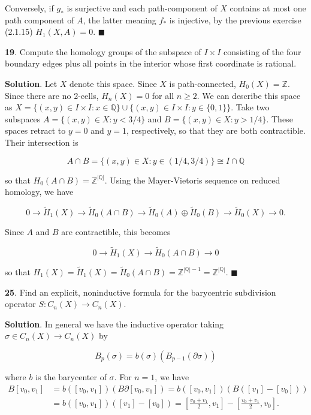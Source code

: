 \documentclass{article}
\newcommand{\Z}{\mathbb{Z}}
\newcommand{\Q}{\mathbb{Q}}
\begin{document}
Conversely, if $g_{\ast}$ is surjective and each path-component of $X$ contains at most one path component of $A$, the latter meaning $f_{\ast}$ is injective, by the previous exercise (2.1.15) $H_{1}(X, A) = 0$. $\blacksquare$
\bigskip
\bigskip

\textbf{19}. Compute the homology groups of the subspace of $I\times I$ consisting of the four boundary edges plus all points in the interior whose first coordinate is rational.
\medskip

\textbf{Solution}. Let $X$ denote this space. Since $X$ is path-connected, $H_{0}(X) = \Z$. Since there are no 2-cells, $H_{n}(X) = 0$ for all $n\geq 2$. We can describe this space as $X = \{(x, y)\in I\times I: x\in \Q\}\cup \{(x, y)\in I\times I: y\in \{0, 1\}\}$. Take two subspaces $A = \{(x, y)\in X: y < 3/4\}$ and $B = \{(x, y)\in X: y > 1/4\}$. These spaces retract to $y = 0$ and $y = 1$, respectively, so that they are both contractible. Their intersection is

$$A\cap B = \{(x, y)\in X: y\in (1/4, 3/4)\}\cong I\cap \Q$$

so that $H_{0}(A\cap B) = \Z^{|\Q|}$. Using the Mayer-Vietoris sequence on reduced homology, we have

$$0\to \tilde{H}_{1}(X)\to \tilde{H}_{0}(A\cap B)\to \tilde{H}_{0}(A)\oplus \tilde{H}_{0}(B)\to \tilde{H}_{0}(X)\to 0.$$

Since $A$ and $B$ are contractible, this becomes

$$0\to \tilde{H}_{1}(X)\to \tilde{H}_{0}(A\cap B)\to  0$$

so that $H_{1}(X) = \tilde{H}_{1}(X) = \tilde{H}_{0}(A\cap B) = \Z^{|\Q|-1} = \Z^{|\Q|}$. $\blacksquare$
\bigskip
\bigskip

\textbf{25}. Find an explicit, noninductive formula for the barycentric subdivision operator $S:C_{n}(X)\to C_{n}(X)$.
\medskip

\textbf{Solution}. In general we have the inductive operator taking $\sigma\in C_{n}(X)\to C_{n}(X)$ by

$$B_{p}(\sigma) = b(\sigma)\left(B_{p-1}(\partial\sigma)\right)$$

where $b$ is the barycenter of $\sigma$. For $n = 1$, we have
\begin{align*}
B[v_{0}, v_{1}] &= b([v_{0}, v_{1}])(B\partial [v_{0}, v_{1}]) = b([v_{0}, v_{1}])(B([v_{1}]-[v_{0}]))\\ &= b([v_{0}, v_{1}])([v_{1}]-[v_{0}]) = \left[\frac{v_{0}+v_{1}}{2}, v_{1}\right] - \left[\frac{v_{0}+v_{1}}{2}, v_{0}\right].
\end{align*}
\end{document}
